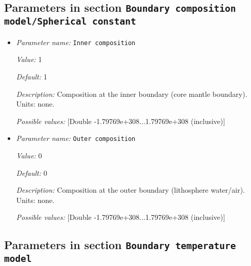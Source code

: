 \subsection{Parameters in section \tt Boundary composition model/Spherical constant}
\label{parameters:Boundary_20composition_20model/Spherical_20constant}

\begin{itemize}
\item {\it Parameter name:} {\tt Inner composition}
\label{parameters:Boundary composition model/Spherical constant/Inner composition}


{\it Value:} 1


{\it Default:} 1


{\it Description:} Composition at the inner boundary (core mantle boundary). Units: none.


{\it Possible values:} [Double -1.79769e+308...1.79769e+308 (inclusive)]
\item {\it Parameter name:} {\tt Outer composition}
\label{parameters:Boundary composition model/Spherical constant/Outer composition}


{\it Value:} 0


{\it Default:} 0


{\it Description:} Composition at the outer boundary (lithosphere water/air). Units: none.


{\it Possible values:} [Double -1.79769e+308...1.79769e+308 (inclusive)]
\end{itemize}

\subsection{Parameters in section \tt Boundary temperature model}
\label{parameters:Boundary_20temperature_20model}

